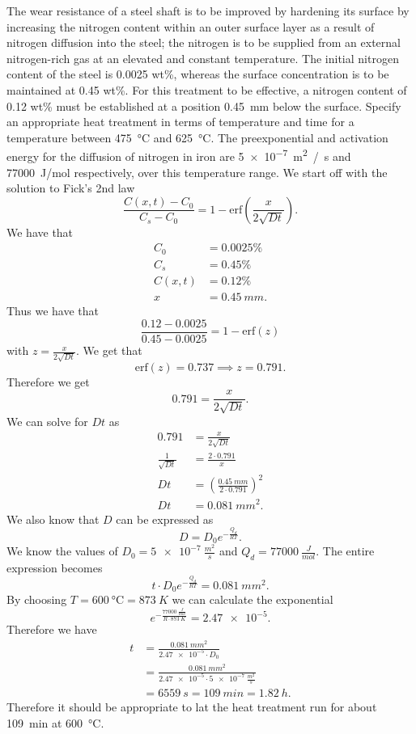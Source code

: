 The wear resistance of a steel shaft is to be improved by hardening its surface by increasing the nitrogen content within an outer surface layer as a result of nitrogen diffusion into the steel; the nitrogen is to be supplied from an external nitrogen-rich gas at an elevated and constant temperature. The initial nitrogen content of the steel is \num{0,0025} wt\%, whereas the surface concentration is to be maintained at \num{0,45} wt\%. For this treatment to be effective, a nitrogen content of \num{0,12} wt\% must be established at a position \qty{0,45}{mm} below the surface. Specify an appropriate heat treatment in terms of temperature and time for a temperature between \qty{475}{\celsius} and \qty{625}{\celsius}. The preexponential and activation energy for the diffusion of nitrogen in iron are \qty{5e-7}{m^2 / s} and \qty{77000}{J/mol} respectively, over this temperature range.
\bigbreak
We start off with the solution to Fick's 2nd law
\[ 
\frac{C(x,t) - C_0}{C_s - C_0} = 1 - \mathrm{erf} \left( \frac{x}{2 \sqrt{Dt}} \right)
.\]
We have that
\begin{align*}
  C_0 &= \num{0,0025} \%  \\
  C_s &= \num{0,45} \% \\
  C(x,t) &= \num{0,12} \% \\
  x &= \qty{0,45}{mm}  
.\end{align*}
Thus we have that
\[ 
\frac{\num{0,12} - \num{0,0025}}{\num{0,45} - \num{0,0025}} = 1 - \mathrm{erf}(z)
\]
with $z = \frac{x}{2 \sqrt{Dt}}$. We get that
\[ 
\mathrm{erf}(z) = \num{0,737} \implies z = \num{0,791} 
.\]
Therefore we get
\[ 
\num{0,791} = \frac{x}{2 \sqrt{Dt}}
.\]
We can solve for $Dt$ as
\begin{align*}
  \num{0,791}  &= \frac{x}{2 \sqrt{Dt}} \\
  \frac{1}{\sqrt{Dt}} &= \frac{2 \cdot \num{0,791}}{x} \\
  Dt &= \left( \frac{\qty{0,45}{mm}}{2 \cdot \num{0,791}} \right)^2 \\
  Dt &= \qty{0,081}{mm^2} 
.\end{align*}
We also know that $D$ can be expressed as
\[ 
D = D_0 e^{- \frac{Q_d}{RT}}
.\]
We know the values of $D_0 = \qty{5e-7}{\frac{m^2}{s}}$ and $Q_d = \qty{77000}{\frac{J}{mol}}$. The entire expression becomes
\[ 
t \cdot D_0 e^{- \frac{Q_d}{RT}} = \qty{0,081}{mm^2} 
.\]
By choosing $T = \qty{600}{\celsius} = \qty{873}{K}$ we can calculate the exponential
\[ 
  e^{- \frac{\qty{77000}{\frac{J}{mol}}}{R \cdot \qty{873}{K}}} = \num{2,47e-5} 
.\]
Therefore we have
\begin{align*}
  t &= \frac{\qty{0,081}{mm^2}}{\num{2,47e-5} \cdot D_0} \\
  &= \frac{\qty{0,081}{mm^2}}{\num{2,47e-5} \cdot \qty{5e-7}{\frac{m^2}{s}}} \\
  &= \qty{6559}{s} = \qty{109}{min} = \qty{1,82}{h}
.\end{align*}
Therefore it should be appropriate to lat the heat treatment run for about \qty{109}{min} at \qty{600}{\celsius}. 
